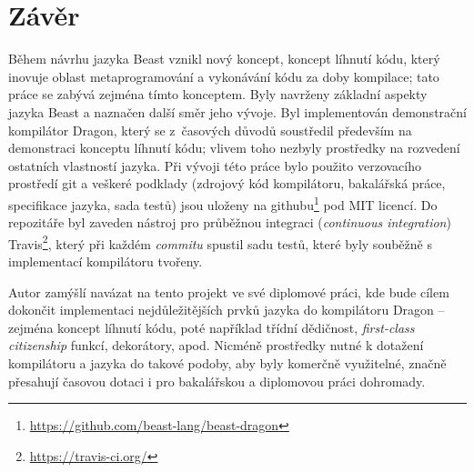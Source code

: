 \chapter{Závěr}
Během návrhu jazyka Beast vznikl nový koncept, koncept líhnutí kódu, který inovuje oblast metaprogramování a vykonávání kódu za doby kompilace; tato práce se zabývá zejména tímto konceptem. Byly navrženy základní aspekty jazyka Beast a naznačen další směr jeho vývoje. Byl implementován demonstrační kompilátor Dragon, který se z~časových důvodů soustředil především na demonstraci konceptu líhnutí kódu; vlivem toho nezbyly prostředky na rozvedení ostatních vlastností jazyka. Při vývoji této práce bylo použito verzovacího prostředí git a veškeré podklady (zdrojový kód kompilátoru, bakalářská práce, specifikace jazyka, sada testů) jsou uloženy na githubu\footnote{\url{https://github.com/beast-lang/beast-dragon}} pod MIT licencí. Do repozitáře byl zaveden nástroj pro průběžnou integraci (\textit{continuous integration}) Travis\footnote{\url{https://travis-ci.org/}}, který při každém \textit{commitu} spustil sadu testů, které byly souběžně s implementací kompilátoru tvořeny.

Autor zamýšlí navázat na tento projekt ve své diplomové práci, kde bude cílem dokončit implementaci nejdůležitějších prvků jazyka do kompilátoru Dragon -- zejména koncept líhnutí kódu, poté například třídní dědičnost, \textit{first-class citizenship} funkcí, dekorátory, apod. Nicméně prostředky nutné k dotažení kompilátoru a jazyka do takové podoby, aby byly komerčně využitelné, značně přesahují časovou dotaci i pro bakalářskou a diplomovou práci dohromady.
